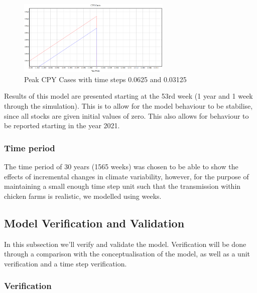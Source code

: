 \begin{figure}[h!]
\centering
\includegraphics[width=0.65\textwidth]{images/timestep.PNG}
\caption{Peak CPY Cases with time steps 0.0625 and 0.03125}
\label{fig:cpy cases with time step}
\end{figure}


Results of this model are presented starting at the 53rd week (1 year and 1 week through the simulation). This is to allow for the model behaviour to be stabilise, since all stocks are given initial values of zero. This also allows for behaviour to be reported starting in the year 2021.

\subsubsection{Time period}
The time period of 30 years (1565 weeks) was chosen to be able to show the effects of incremental changes in climate variability, however, for the purpose of maintaining a small enough time step unit such that the transmission within chicken farms is realistic, we modelled using weeks. %

\subsection{Model Verification and Validation}
In this subsection we'll verify and validate the model. Verification will be done through a comparison with the conceptualisation of the model, as well as a unit verification and a time step verification. 

\subsubsection{Verification}
\label{s:verification}

